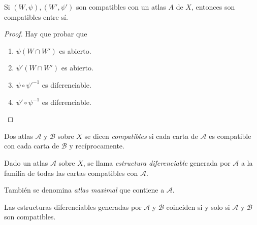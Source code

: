 \documentclass[ebook,oneside]{memoir}
\numberwithin{equation}{chapter}
\begin{document}
\begin{lemma}
  \label{lem:compat-trans-atlas}
  Si \((W, \psi), (W', \psi')\) son compatibles con un atlas \(A\) de \(X\),
  entonces son compatibles entre sí.
\end{lemma}

\begin{proof}
  Hay que probar que
  \begin{enumerate}
  \item \(\psi(W \cap W')\) es abierto.
  \item \(\psi'(W \cap W')\) es abierto.
  \item \(\psi \circ \psi'^{-1}\) es diferenciable.
  \item \(\psi' \circ \psi^{-1}\) es diferenciable.
  \end{enumerate}
\end{proof}

\begin{definition}
  Dos atlas \(\mathcal{A}\) y \(\mathcal{B}\) sobre \(X\) se dicen
  \emph{compatibles} si cada carta de \(\mathcal{A}\) es compatible con cada
  carta de \(\mathcal{B}\) y recíprocamente.
\end{definition}

\begin{definition}
  Dado un atlas \(\mathcal{A}\) sobre \(X\), se llama \emph{estructura
    diferenciable} generada por \(\mathcal{A}\) a la familia de todas las cartas
  compatibles con \(\mathcal{A}\).

  También se denomina \emph{atlas maximal} que contiene a \(\mathcal{A}\).
\end{definition}

\begin{lemma}
  Las estructuras diferenciables generadas por \(\mathcal{A}\) y \(\mathcal{B}\)
  coinciden si y solo si \(\mathcal{A}\) y \(\mathcal{B}\) son compatibles.
\end{lemma}
\end{document}
